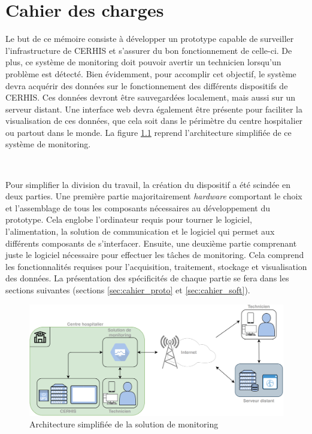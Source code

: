 \chapter{Cahier des charges}
\label{chap:3}

\noindent
Le but de ce mémoire consiste à développer un prototype capable de surveiller l'infrastructure de CERHIS et s'assurer du bon fonctionnement de celle-ci. De plus, ce système de monitoring doit pouvoir avertir un technicien lorsqu'un problème est détecté. Bien évidemment, pour accomplir cet objectif, le système devra acquérir des données sur le fonctionnement des différents dispositifs de CERHIS. Ces données devront être sauvegardées localement, mais aussi sur un serveur distant. Une interface web devra également être présente pour faciliter la visualisation de ces données, que cela soit dans le périmètre du centre hospitalier ou partout dans le monde. La figure \ref{fig:mon_archi_simple} reprend l'architecture simplifiée de ce système de monitoring.

~

\noindent
Pour simplifier la division du travail, la création du dispositif a été scindée en deux parties.
Une première partie majoritairement \textit{hardware} comportant le choix et l'assemblage de tous les composants nécessaires au développement du prototype. Cela englobe l'ordinateur requis pour tourner le logiciel, l'alimentation, la solution de communication et le logiciel qui permet aux différents composants de s'interfacer. Ensuite, une deuxième partie comprenant juste le logiciel nécessaire pour effectuer les tâches de monitoring. Cela comprend les fonctionnalités requises pour l'acquisition, traitement, stockage et visualisation des données. La présentation des spécificités de chaque partie se fera dans les sections suivantes (sections \ref{sec:cahier_proto} et \ref{sec:cahier_soft}).



\begin{figure}[ht!]
  \centering
  \includegraphics[width=\textwidth]{img/cahier_des_charges/baseline_archi.png}
  \caption{Architecture simplifiée de la solution de monitoring}
  \label{fig:mon_archi_simple}
\end{figure}

